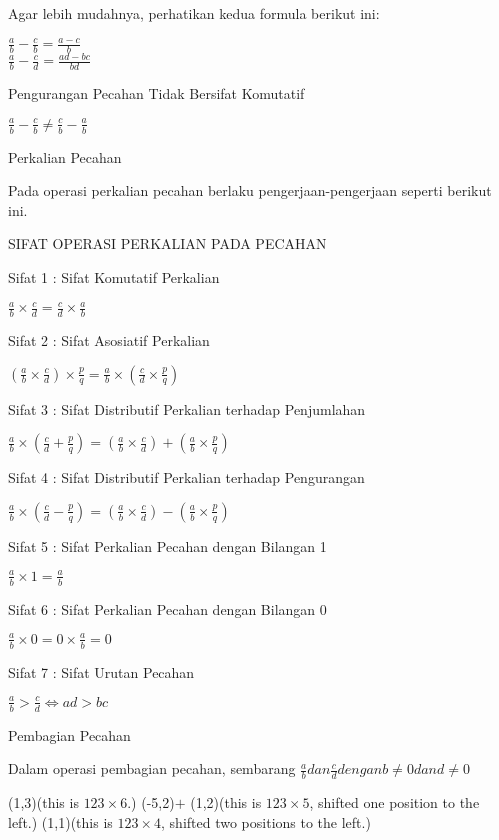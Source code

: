 \begin{enumerate}
	Agar lebih mudahnya, perhatikan kedua formula berikut ini:
	
	$\frac{a}{b}-\frac{c}{b}=\frac{a-c}{b}$\\
	
	$\frac{a}{b}-\frac{c}{d}=\frac{ad-bc}{bd}$
	
	Pengurangan Pecahan Tidak Bersifat Komutatif
	
	$\frac{a}{b}-\frac{c}{b}\neq\frac{c}{b}-\frac{a}{b}$
	
	Perkalian Pecahan
	
	Pada operasi perkalian pecahan berlaku pengerjaan-pengerjaan seperti berikut ini.
	
	
	SIFAT OPERASI PERKALIAN PADA PECAHAN
	
	Sifat 1 : Sifat Komutatif Perkalian
	
	$\frac{a}{b}\times\frac{c}{d}=\frac{c}{d}\times\frac{a}{b}$
	
	Sifat 2 : Sifat Asosiatif Perkalian
	
	$\left(\frac{a}{b}\times\frac{c}{d}\right)\times\frac{p}{q}=\frac{a}{b}\times\left(\frac{c}{d}\times\frac{p}{q}\right)$
	
	Sifat 3 : Sifat Distributif Perkalian terhadap Penjumlahan
	
	$\frac{a}{b}\times\left(\frac{c}{d}+\frac{p}{q}\right)=\left(\frac{a}{b}\times\frac{c}{d}\right)+\left(\frac{a}{b}\times\frac{p}{q}\right)$
	
	Sifat 4 : Sifat Distributif Perkalian terhadap Pengurangan
	
	$\frac{a}{b}\times\left(\frac{c}{d}-\frac{p}{q}\right)=\left(\frac{a}{b}\times\frac{c}{d}\right)-\left(\frac{a}{b}\times\frac{p}{q}\right)$
	
	Sifat 5 : Sifat Perkalian Pecahan dengan Bilangan 1
	
	$\frac{a}{b}\times1=\frac{a}{b}$
	
	Sifat 6 : Sifat Perkalian Pecahan dengan Bilangan 0
	
	$\frac{a}{b}\times0=0\times\frac{a}{b}=0$
	
	Sifat 7 : Sifat Urutan Pecahan
	
	$\frac{a}{b}>\frac{c}{d}\Longleftrightarrow ad>bc$
	
	
	
	Pembagian Pecahan
	
	Dalam operasi pembagian pecahan, sembarang $\frac{a}{b} dan \frac{c}{d} dengan b\neq0 dan d\neq 0$
	
	\end{enumerate}
 
	 	\oplput(1,3){(this is $123 \times 6$.)}
	 	\oprput(-5,2){$+$}
	 	\oplput(1,2){(this is $123 \times 5$, shifted one position to the left.)}
	 	\oplput(1,1){(this is $123 \times 4$, shifted two positions to the left.)}
	